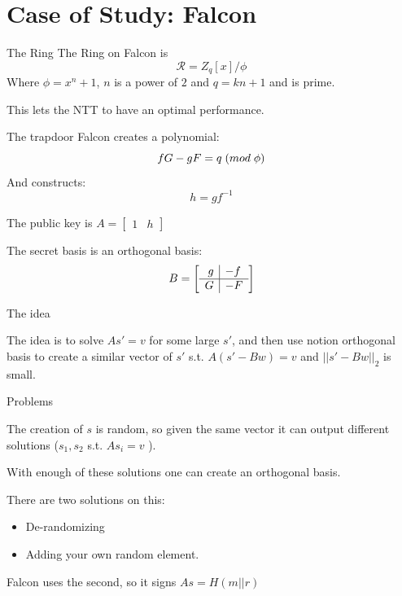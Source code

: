 \documentclass[presentation]{beamer}
\begin{document}
\section{Case of Study: Falcon}
\begin{frame}[label=the-ring]{The Ring}
  The Ring on Falcon \cite{falcon20} is
  \[
    \mathcal R = Z_q[x] / \phi
  \]
  Where \(\phi = x^n + 1\), \(n\) is a power of \(2\) and 
  \(q = kn + 1\) and is prime.

  This lets the NTT to have an optimal performance. 
\end{frame}
\begin{frame}[label=the-trapdoor]{The trapdoor}
  Falcon creates a polynomial:
  \[
    fG - gF = q \; \text({mod } \;\phi \text{)}
  \]
  And constructs:
  \[
    h = gf^{-1}
  \]

  The public key is 
  $A = \left[ \begin{array}{r|l} 1 &h\end{array} \right]$

  The secret basis is an orthogonal basis:
  \[
    B = \left[
      \begin{array}{r | l}
        g &-f\\
        \hline
        G &-F
      \end{array}
    \right]
  \]

\end{frame}

\begin{frame}[label=the-idea]{The idea}

  The idea is to solve \(As' = v\) for some large \(s'\), and
  then use notion orthogonal basis to create a similar vector of
  \(s'\) s.t.  \(A(s' -Bw) = v\) and \(||s' - Bw||_2\) is small.

\end{frame}
\begin{frame}[label=problems]{Problems}

  The creation of \(s\) is random, so given the same vector
  it \alert{can} output different solutions (\(s_1, s_2\)
  s.t. \(As_i = v\) ).

  With enough of these solutions one can create an orthogonal
  basis.

  There are two solutions on this:

  \begin{itemize}
    \item De-randomizing
    \item Adding your own random element.
  \end{itemize}

  Falcon uses the second, so it signs \(As = H(m || r)\)

\end{frame}
\end{document}
